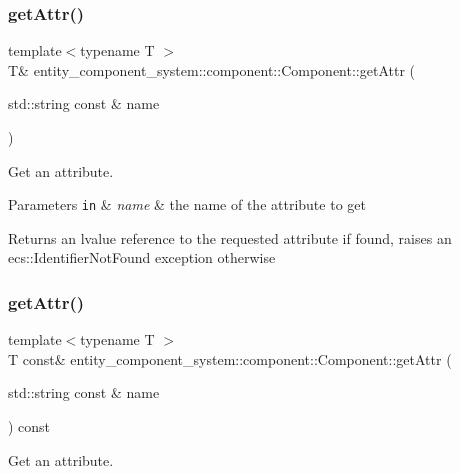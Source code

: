 \subsubsection{get\+Attr()\hspace{0.1cm}{\footnotesize\ttfamily [1/2]}}
{\footnotesize\ttfamily template$<$typename T $>$ \\
T\& entity\+\_\+component\+\_\+system\+::component\+::\+Component\+::get\+Attr (\begin{DoxyParamCaption}\item[{std\+::string const \&}]{name }\end{DoxyParamCaption})\hspace{0.3cm}{\ttfamily [inline]}}



Get an attribute. 


\begin{DoxyParams}[1]{Parameters}
\mbox{\tt in}  & {\em name} & the name of the attribute to get \\
\hline
\end{DoxyParams}
\begin{DoxyReturn}{Returns}
an lvalue reference to the requested attribute if found, raises an ecs\+::\+Identifier\+Not\+Found exception otherwise 
\end{DoxyReturn}
\label{classentity__component__system_1_1component_1_1_component_ac6c48a91232313e49986f301f6af8d87} 
\subsubsection{get\+Attr()\hspace{0.1cm}{\footnotesize\ttfamily [2/2]}}
{\footnotesize\ttfamily template$<$typename T $>$ \\
T const\& entity\+\_\+component\+\_\+system\+::component\+::\+Component\+::get\+Attr (\begin{DoxyParamCaption}\item[{std\+::string const \&}]{name }\end{DoxyParamCaption}) const\hspace{0.3cm}{\ttfamily [inline]}}



Get an attribute. 


